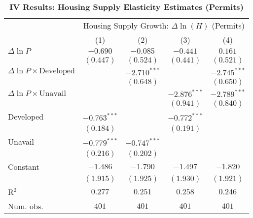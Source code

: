 
\begin{table}[H]
\caption{\textbf{IV Results: Housing Supply Elasticity Estimates (Permits)}}
\begin{center}
\begin{normalsize}
\begin{threeparttable}
\begin{tabular}{l@{} c@{} c@{} c@{} c@{}}
\toprule
 & \multicolumn{4}{c}{Housing Supply Growth: $\Delta\ln(H)$ (Permits)} \\
\cmidrule(lr){2-5}
 & (1) & (2) & (3) & (4) \\
\midrule
$\Delta\ln P$                         & $-0.690$       & $-0.085$       & $-0.441$       & $0.161$        \\
                                      & $(0.447)$      & $(0.524)$      & $(0.441)$      & $(0.521)$      \\
$\Delta\ln P\times{\text{Developed}}$ &                & $-2.710^{***}$ &                & $-2.745^{***}$ \\
                                      &                & $(0.648)$      &                & $(0.650)$      \\
$\Delta\ln P\times{\text{Unavail}}$   &                &                & $-2.876^{***}$ & $-2.789^{***}$ \\
                                      &                &                & $(0.941)$      & $(0.840)$      \\
Developed                             & $-0.763^{***}$ &                & $-0.772^{***}$ &                \\
                                      & $(0.184)$      &                & $(0.191)$      &                \\
Unavail                               & $-0.779^{***}$ & $-0.747^{***}$ &                &                \\
                                      & $(0.216)$      & $(0.202)$      &                &                \\
Constant                              & $-1.486$       & $-1.790$       & $-1.497$       & $-1.820$       \\
                                      & $(1.915)$      & $(1.925)$      & $(1.930)$      & $(1.921)$      \\
\midrule
R$^2$                                 & $0.277$        & $0.251$        & $0.258$        & $0.246$        \\
Num. obs.                             & $401$          & $401$          & $401$          & $401$          \\

\end{tabular}
\end{threeparttable}
\end{normalsize}
\end{center}
\end{table}
